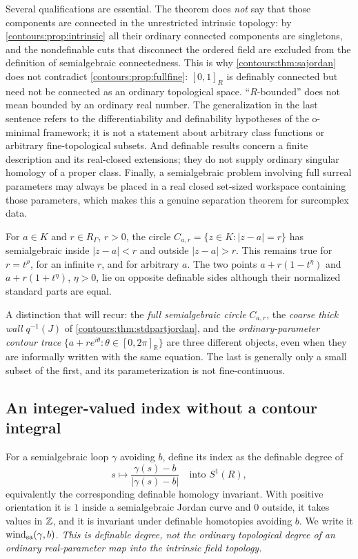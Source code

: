 \documentclass[11pt,letterpaper]{article}
\theoremstyle{definition}
\theoremstyle{remark}
\newcommand{\R}{\mathbb R}\newcommand{\C}{\mathbb C}\newcommand{\Q}{\mathbb Q}
\numberwithin{equation}{section}
\begin{document}
Several qualifications are essential. The theorem does \emph{not} say that those
components are connected in the unrestricted intrinsic topology: by
\cref{contours:prop:intrinsic} all their ordinary connected components are
singletons, and the nondefinable cuts that disconnect the ordered field are
excluded from the definition of semialgebraic connectedness. This is why
\cref{contours:thm:sajordan} does not contradict \cref{contours:prop:fullfine}:
$[0,1]_R$ is definably connected but need not be connected as an ordinary
topological space. ``$R$-bounded'' does not mean bounded by an ordinary real
number. The generalization in the last sentence refers to the differentiability and
definability hypotheses of the o-minimal framework; it is not a statement about
arbitrary class functions or arbitrary fine-topological subsets. And definable
results concern a finite description and its real-closed extensions; they do not
supply ordinary singular homology of a proper class. Finally, a semialgebraic
problem involving full surreal parameters may always be placed in a real closed
set-sized workspace containing those parameters, which makes this a genuine
separation theorem for surcomplex data.

\begin{example}
\label{contours:ex:definablecircle}
For $a\in K$ and $r\in R_\Gamma$, $r>0$, the circle $C_{a,r}=\{z\in K:|z-a|=r\}$
has semialgebraic inside $|z-a|<r$ and outside $|z-a|>r$. This remains true for
$r=t^\rho$, for an infinite $r$, and for arbitrary $a$. The two points
$a+r(1-t^\eta)$ and $a+r(1+t^\eta)$, $\eta>0$, lie on opposite definable sides
although their normalized standard parts are equal.
\end{example}

A distinction that will recur: the \emph{full semialgebraic circle} $C_{a,r}$, the
\emph{coarse thick wall} $q^{-1}(J)$ of \cref{contours:thm:stdpartjordan}, and the
\emph{ordinary-parameter contour trace} $\{a+re^{i\theta}:\theta\in[0,2\pi]_\R\}$
are three different objects, even when they are informally written with the same
equation. The last is generally only a small subset of the first, and its
parameterization is not fine-continuous.

\subsection{An integer-valued index without a contour integral}
For a semialgebraic loop $\gamma$ avoiding $b$, define its index as the definable
degree of
\[
  s\longmapsto\frac{\gamma(s)-b}{|\gamma(s)-b|}\quad\text{into }S^1(R),
\]
equivalently the corresponding definable homology invariant. With positive
orientation it is $1$ inside a semialgebraic Jordan curve and $0$ outside, it takes
values in $\mathbb Z$, and it is invariant under definable homotopies avoiding $b$. We
write it $\operatorname{wind}_{\mathrm{sa}}(\gamma,b)$. \emph{This is definable degree, not the
ordinary topological degree of an ordinary real-parameter map into the intrinsic
field topology.}
\end{document}
